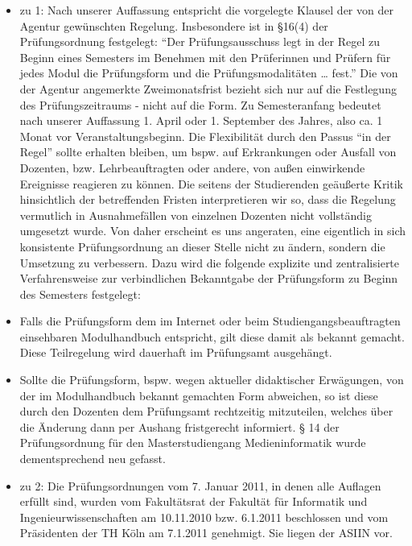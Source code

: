 \begin{itemize}
\tightlist
\item
  zu 1: Nach unserer Auffassung entspricht die vorgelegte Klausel der
  von der Agentur gewünschten Regelung. Insbesondere ist in §16(4) der
  Prüfungsordnung festgelegt: ``Der Prüfungsausschuss legt in der Regel
  zu Beginn eines Semesters im Benehmen mit den Prüferinnen und Prüfern
  für jedes Modul die Prüfungsform und die Prüfungsmodalitäten \ldots{}
  fest.'' Die von der Agentur angemerkte Zweimonatsfrist bezieht sich
  nur auf die Festlegung des Prüfungszeitraums - nicht auf die Form. Zu
  Semesteranfang bedeutet nach unserer Auffassung 1. April oder 1.
  September des Jahres, also ca. 1 Monat vor Veranstaltungsbeginn. Die
  Flexibilität durch den Passus ``in der Regel'' sollte erhalten
  bleiben, um bspw. auf Erkrankungen oder Ausfall von Dozenten, bzw.
  Lehrbeauftragten oder andere, von außen einwirkende Ereignisse
  reagieren zu können. Die seitens der Studierenden geäußerte Kritik
  hinsichtlich der betreffenden Fristen interpretieren wir so, dass die
  Regelung vermutlich in Ausnahmefällen von einzelnen Dozenten nicht
  vollständig umgesetzt wurde. Von daher erscheint es uns angeraten,
  eine eigentlich in sich konsistente Prüfungsordnung an dieser Stelle
  nicht zu ändern, sondern die Umsetzung zu verbessern. Dazu wird die
  folgende explizite und zentralisierte Verfahrensweise zur
  verbindlichen Bekanntgabe der Prüfungsform zu Beginn des Semesters
  festgelegt:
\item
  Falls die Prüfungsform dem im Internet oder beim
  Studiengangsbeauftragten einsehbaren Modulhandbuch entspricht, gilt
  diese damit als bekannt gemacht. Diese Teilregelung wird dauerhaft im
  Prüfungsamt ausgehängt.
\item
  Sollte die Prüfungsform, bspw. wegen aktueller didaktischer
  Erwägungen, von der im Modulhandbuch bekannt gemachten Form abweichen,
  so ist diese durch den Dozenten dem Prüfungsamt rechtzeitig
  mitzuteilen, welches über die Änderung dann per Aushang fristgerecht
  informiert. § 14 der Prüfungsordnung für den Masterstudiengang
  Medieninformatik wurde dementsprechend neu gefasst.
\item
  zu 2: Die Prüfungsordnungen vom 7. Januar 2011, in denen alle Auflagen
  erfüllt sind, wurden vom Fakultätsrat der Fakultät für Informatik und
  Ingenieurwissenschaften am 10.11.2010 bzw. 6.1.2011 beschlossen und
  vom Präsidenten der TH Köln am 7.1.2011 genehmigt. Sie liegen der
  ASIIN vor.
\end{itemize}

